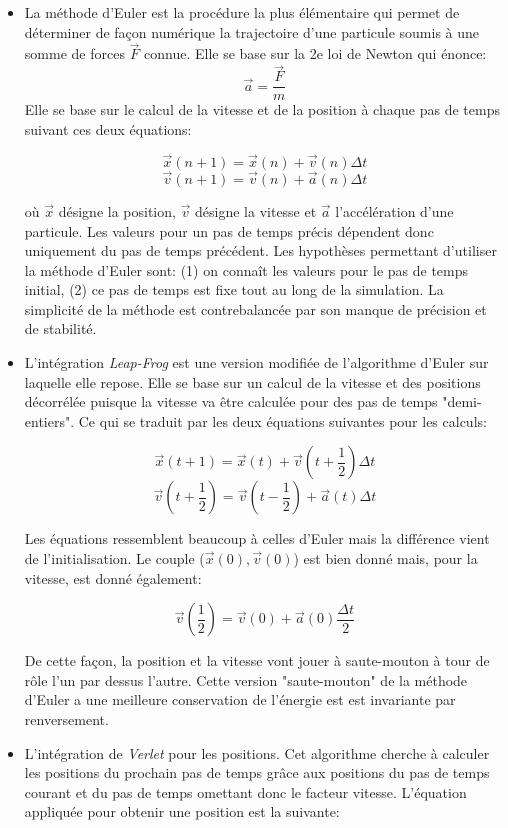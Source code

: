 \begin{itemize}
	\item La méthode d'Euler est la procédure la plus élémentaire qui permet de déterminer de façon numérique la trajectoire d'une particule soumis à une somme de forces $\overrightarrow{F}$ connue. Elle se base sur la 2e loi de Newton qui énonce:
	$$\overrightarrow{a} = \frac{\overrightarrow{F}}{m}$$
	Elle se base sur le calcul de la vitesse et de la position à chaque pas de temps suivant ces deux équations:

	$$\overrightarrow{x}(n+1) = \overrightarrow{x}(n) + \overrightarrow{v}(n)\Delta t$$
	$$\overrightarrow{v}(n+1) = \overrightarrow{v}(n) + \overrightarrow{a}(n)\Delta t$$

	où $\overrightarrow{x}$ désigne la position, $\overrightarrow{v}$ désigne la vitesse et $\overrightarrow{a}$ l'accélération d'une particule.
	Les valeurs pour un pas de temps précis dépendent donc uniquement du pas de temps précédent. Les hypothèses permettant d'utiliser la méthode d'Euler sont: (1) on connaît les valeurs pour le pas de temps initial, (2) ce pas de temps est fixe tout au long de la simulation. La simplicité de la méthode est contrebalancée par son manque de précision et de stabilité.
	\item L'intégration \textit{Leap-Frog} est une version modifiée de l'algorithme d'Euler sur laquelle elle repose. Elle se base sur un calcul de la vitesse et des positions décorrélée puisque la vitesse va être calculée pour des pas de temps "demi-entiers". Ce qui se traduit par les deux équations suivantes pour les calculs:

	$$\overrightarrow{x}(t+1) = \overrightarrow{x}(t) + \overrightarrow{v}(t+\frac{1}{2})\Delta t$$
	$$\overrightarrow{v}(t+\frac{1}{2}) = \overrightarrow{v}(t-\frac{1}{2}) + \overrightarrow{a}(t)\Delta t$$

	Les équations ressemblent beaucoup à celles d'Euler mais la différence vient de l'initialisation. Le couple ($\overrightarrow{x}(0),\overrightarrow{v}(0)$) est bien donné mais, pour la vitesse, est donné également:

	$$\overrightarrow{v}(\frac{1}{2}) = \overrightarrow{v}(0) + \overrightarrow{a}(0)\frac{\Delta t}{2}$$

	De cette façon, la position et la vitesse vont jouer à saute-mouton à tour de rôle l'un par dessus l'autre. Cette version "saute-mouton" de la méthode d'Euler a une meilleure conservation de l'énergie est est invariante par renversement.
	\item L'intégration de \textit{Verlet} pour les positions. Cet algorithme cherche à calculer les positions du prochain pas de temps grâce aux positions du pas de temps courant et du pas de temps omettant donc le facteur vitesse. L'équation appliquée pour obtenir une position est la suivante: 


\end{itemize}

